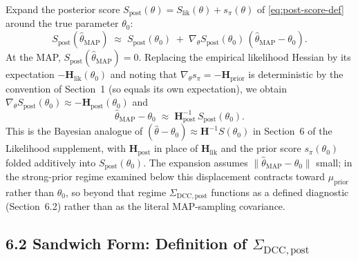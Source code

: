 \documentclass[11pt]{article}
\begin{document}
Expand the posterior score $S_{\mathrm{post}}(\theta) = S_{\mathrm{lik}}(\theta) + s_\pi(\theta)$ of \eqref{eq:post-score-def} around the true parameter $\theta_0$:
\begin{equation}
S_{\mathrm{post}}(\hat\theta_{\mathrm{MAP}})
\;\approx\;
S_{\mathrm{post}}(\theta_0)
\;+\;
\nabla_\theta S_{\mathrm{post}}(\theta_0)\,(\hat\theta_{\mathrm{MAP}} - \theta_0).
\label{eq:posterior-score-taylor}
\end{equation}
At the MAP, $S_{\mathrm{post}}(\hat\theta_{\mathrm{MAP}}) = 0$. Replacing the empirical likelihood Hessian by its expectation $-\mathbf H_{\mathrm{lik}}(\theta_0)$ and noting that $\nabla_\theta s_\pi = -\mathbf H_{\mathrm{prior}}$ is deterministic by the convention of Section~1 (so equals its own expectation), we obtain $\nabla_\theta S_{\mathrm{post}}(\theta_0) \approx -\mathbf H_{\mathrm{post}}(\theta_0)$ and
\begin{equation}
\hat\theta_{\mathrm{MAP}} - \theta_0
\;\approx\;
\mathbf H_{\mathrm{post}}^{-1}\, S_{\mathrm{post}}(\theta_0).
\label{eq:posterior-displacement}
\end{equation}
This is the Bayesian analogue of $(\hat\theta - \theta_0) \approx \mathbf H^{-1} S(\theta_0)$ in Section~6 of the Likelihood supplement, with $\mathbf H_{\mathrm{post}}$ in place of $\mathbf H_{\mathrm{lik}}$ and the prior score $s_\pi(\theta_0)$ folded additively into $S_{\mathrm{post}}(\theta_0)$. The expansion assumes $\|\hat\theta_{\mathrm{MAP}} - \theta_0\|$ small; in the strong-prior regime examined below this displacement contracts toward $\mu_{\mathrm{prior}}$ rather than $\theta_0$, so beyond that regime $\Sigma_{\mathrm{DCC},\mathrm{post}}$ functions as a defined diagnostic (Section~6.2) rather than as the literal MAP-sampling covariance.

\subsection*{6.2 Sandwich Form: Definition of $\Sigma_{\mathrm{DCC},\mathrm{post}}$}
\end{document}
